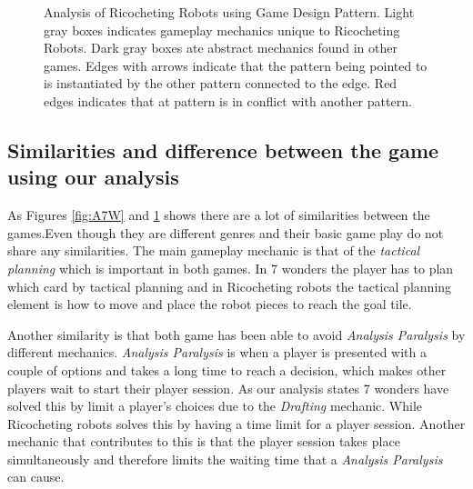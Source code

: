 \documentclass[a4paper]{article}
\begin{document}
\begin{figure}[htb]

  \caption{Analysis of Ricocheting Robots using Game Design Pattern. Light gray boxes indicates gameplay mechanics unique to Ricocheting Robots. Dark gray boxes ate abstract mechanics found in other games. Edges with arrows indicate that the pattern being pointed to is instantiated by the other pattern connected to the edge. Red edges indicates that at pattern is in conflict with another pattern.} 
  \label{fig:RRW}
\end{figure}


\subsection{Similarities and difference between the game using our analysis}
  As Figures \ref{fig:A7W} and \ref{fig:RRW} shows there are a lot of similarities between the games.Even though they are different genres and their basic game play do not share any similarities. The main gameplay mechanic is that of the \textit{tactical planning} which is important in both games. In 7 wonders the player has to plan which card by tactical planning and in Ricocheting robots the tactical planning element is how to move and place the robot pieces to reach the goal tile. 

  Another similarity is that both game has been able to avoid \textit{Analysis Paralysis} by different mechanics. \textit{Analysis Paralysis} is when a player is presented with a couple of options and takes a long time to reach a decision, which makes other players wait to start their player session. As our analysis states 7 wonders have solved this by limit a player's choices due to the \textit{Drafting} mechanic. While Ricocheting robots solves this by having a time limit for a player session. Another mechanic that contributes to this is that the player session takes place simultaneously and therefore limits the waiting time that a \textit{Analysis Paralysis} can cause.
\end{document}
